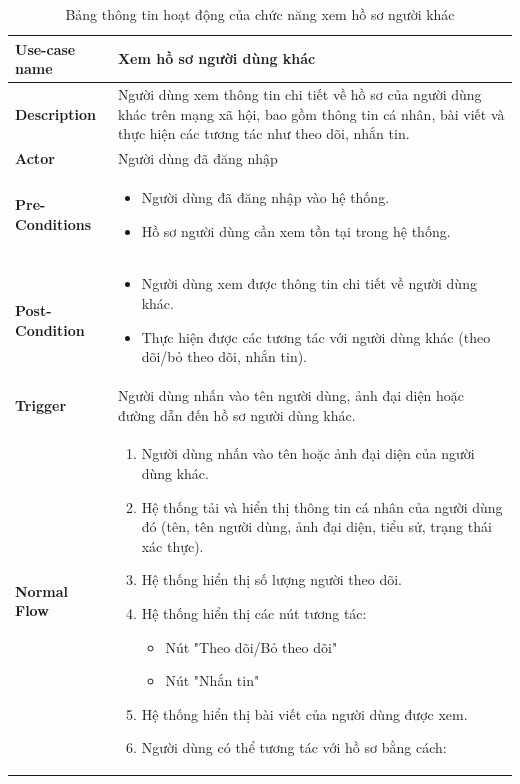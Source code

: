 \begin{longtable}{|>{\bfseries}m{4cm}|m{10cm}|}
    \caption{Bảng thông tin hoạt động của chức năng xem hồ sơ người khác}
    \label{table:usecase-other-profile}\\
\hline
Use-case name & Xem hồ sơ người dùng khác \\
\hline
Description & Người dùng xem thông tin chi tiết về hồ sơ của người dùng khác trên mạng xã hội, bao gồm thông tin cá nhân, bài viết và thực hiện các tương tác như theo dõi, nhắn tin. \\
\hline
Actor & Người dùng đã đăng nhập \\
\hline
Pre-Conditions & 
\begin{itemize}
    \item Người dùng đã đăng nhập vào hệ thống.
    \item Hồ sơ người dùng cần xem tồn tại trong hệ thống.
\end{itemize} \\
\hline
Post-Condition & 
\begin{itemize}
    \item Người dùng xem được thông tin chi tiết về người dùng khác.
    \item Thực hiện được các tương tác với người dùng khác (theo dõi/bỏ theo dõi, nhắn tin).
\end{itemize} \\
\hline
Trigger & Người dùng nhấn vào tên người dùng, ảnh đại diện hoặc đường dẫn đến hồ sơ người dùng khác. \\
\hline
Normal Flow &
\begin{enumerate}
    \item Người dùng nhấn vào tên hoặc ảnh đại diện của người dùng khác.
    \item Hệ thống tải và hiển thị thông tin cá nhân của người dùng đó (tên, tên người dùng, ảnh đại diện, tiểu sử, trạng thái xác thực).
    \item Hệ thống hiển thị số lượng người theo dõi.
    \item Hệ thống hiển thị các nút tương tác:
       \begin{itemize}
         \item Nút "Theo dõi/Bỏ theo dõi"
         \item Nút "Nhắn tin"
       \end{itemize}
    \item Hệ thống hiển thị bài viết của người dùng được xem.
    \item Người dùng có thể tương tác với hồ sơ bằng cách:

\end{enumerate}
\end{longtable}
